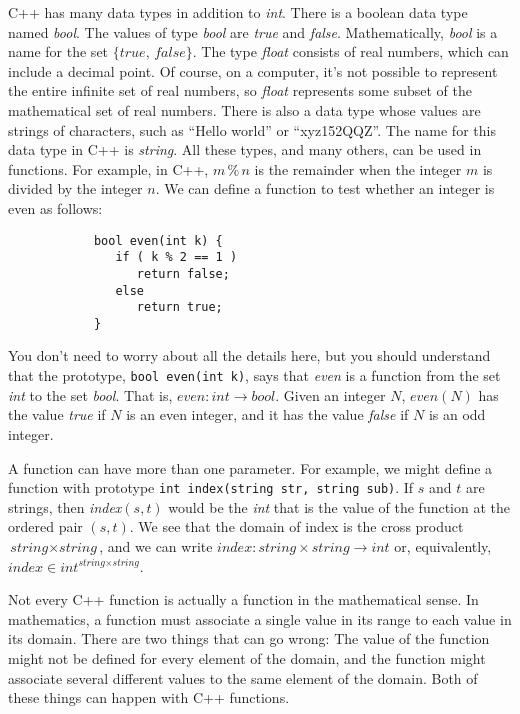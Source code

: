 C++ has many data types in addition to \textit{int}.  There is
a boolean data type named \textit{bool}.  The values of type
\textit{bool} are \textit{true} and \textit{false}.  Mathematically,
\textit{bool} is a name for the set $\{\textit{true},\,\textit{false}\}$.
The type \textit{float} consists of real numbers, which can
include a decimal point.  Of course, on a computer, it's not
possible to represent the entire infinite set of real numbers,
so \textit{float} represents some subset of the mathematical set
of real numbers.  There is also a data type whose values are
strings of characters, such as ``Hello world'' or ``xyz152QQZ''.
The name for this data type in C++ is \textit{string}.  All these
types, and many others, can be used in functions.  For example,
in C++, $m\,\%\,n$ is the remainder when the integer $m$ is
divided by the integer $n$.  We can define a function to test
whether an integer is even as follows:
\begin{verbatim}
            bool even(int k) {
               if ( k % 2 == 1 )
                  return false;
               else
                  return true;
            }
\end{verbatim}
You don't need to worry about all the details here, but you should
understand that the prototype, \verb=bool even(int k)=,
says that \textit{even} is a function from the set \textit{int}
to the set \textit{bool}.  That is,
$\textit{even}\colon\textit{int}\to\textit{bool}$.  Given
an integer $N$, $\textit{even}(N)$ has the value \textit{true}
if $N$ is an even integer, and it has the value \textit{false}
if $N$ is an odd integer.

A function can have more than one parameter.  For example, we might
define a function with prototype \verb=int index(string str, string sub)=.
If $s$ and $t$ are strings, then \textit{index}$(s,t)$ would be the
\textit{int} that is the value of the function at the ordered pair
$(s,t)$.  We see that the domain of index is the cross product
$\textit{string}\times\textit{string}$, and we can write
$\textit{index}\colon \textit{string}\times\textit{string}\to\textit{int}$
or, equivalently, $\textit{index}\in\textit{int}^{\textit{string}\times\textit{string}}$.

\medbreak

Not every C++ function is actually a function in the mathematical
sense.  In mathematics, a function must associate a single value in
its range to each value in its domain.  There are two things
that can go wrong:  The value of the function might not be defined
for every element of the domain, and the function might associate
several different values to the same element of the domain.
Both of these things can happen with C++ functions.

